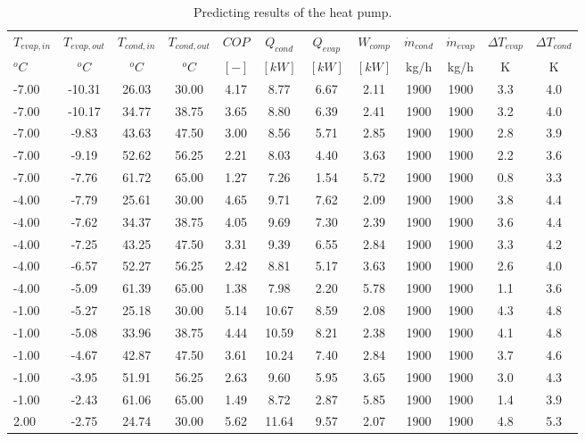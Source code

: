 \documentclass[english]{SPFShortReport}
\begin{document}
\begin{table}[!ht]
\begin{small}
\caption{Predicting results of the heat pump.}
\begin{center}
\resizebox{12cm}{!} 
{
\begin{tabular}{l | c c c c c c c c c c c } 
\hline
\hline
$T_{evap,in}$ &$T_{evap,out}$ &$T_{cond,in}$ &$T_{cond,out}$ &$COP$ &$Q_{cond}$ &$Q_{evap}$ &$W_{comp}$ &$\dot m_{cond}$ &$\dot m_{evap}$ &$\Delta T_{evap}$ &$\Delta T_{cond}$ \\ 
$^oC$ &$^oC$ &$^oC$ &$^oC$ &$[-]$ &$[kW]$ &$[kW]$ &$[kW]$ &kg/h &kg/h &K &K\\ 
\hline
-7.00 & -10.31 & 26.03 & 30.00 & 4.17 & 8.77 & 6.67 & 2.11 & 1900 & 1900 & 3.3 & 4.0\\ 
-7.00 & -10.17 & 34.77 & 38.75 & 3.65 & 8.80 & 6.39 & 2.41 & 1900 & 1900 & 3.2 & 4.0\\ 
-7.00 & -9.83 & 43.63 & 47.50 & 3.00 & 8.56 & 5.71 & 2.85 & 1900 & 1900 & 2.8 & 3.9\\ 
-7.00 & -9.19 & 52.62 & 56.25 & 2.21 & 8.03 & 4.40 & 3.63 & 1900 & 1900 & 2.2 & 3.6\\ 
-7.00 & -7.76 & 61.72 & 65.00 & 1.27 & 7.26 & 1.54 & 5.72 & 1900 & 1900 & 0.8 & 3.3\\ 
-4.00 & -7.79 & 25.61 & 30.00 & 4.65 & 9.71 & 7.62 & 2.09 & 1900 & 1900 & 3.8 & 4.4\\ 
-4.00 & -7.62 & 34.37 & 38.75 & 4.05 & 9.69 & 7.30 & 2.39 & 1900 & 1900 & 3.6 & 4.4\\ 
-4.00 & -7.25 & 43.25 & 47.50 & 3.31 & 9.39 & 6.55 & 2.84 & 1900 & 1900 & 3.3 & 4.2\\ 
-4.00 & -6.57 & 52.27 & 56.25 & 2.42 & 8.81 & 5.17 & 3.63 & 1900 & 1900 & 2.6 & 4.0\\ 
-4.00 & -5.09 & 61.39 & 65.00 & 1.38 & 7.98 & 2.20 & 5.78 & 1900 & 1900 & 1.1 & 3.6\\ 
-1.00 & -5.27 & 25.18 & 30.00 & 5.14 & 10.67 & 8.59 & 2.08 & 1900 & 1900 & 4.3 & 4.8\\ 
-1.00 & -5.08 & 33.96 & 38.75 & 4.44 & 10.59 & 8.21 & 2.38 & 1900 & 1900 & 4.1 & 4.8\\ 
-1.00 & -4.67 & 42.87 & 47.50 & 3.61 & 10.24 & 7.40 & 2.84 & 1900 & 1900 & 3.7 & 4.6\\ 
-1.00 & -3.95 & 51.91 & 56.25 & 2.63 & 9.60 & 5.95 & 3.65 & 1900 & 1900 & 3.0 & 4.3\\ 
-1.00 & -2.43 & 61.06 & 65.00 & 1.49 & 8.72 & 2.87 & 5.85 & 1900 & 1900 & 1.4 & 3.9\\ 
2.00 & -2.75 & 24.74 & 30.00 & 5.62 & 11.64 & 9.57 & 2.07 & 1900 & 1900 & 4.8 & 5.3\\ 

\end{tabular}}
\end{center}
\end{small}
\end{table}
\end{document}
